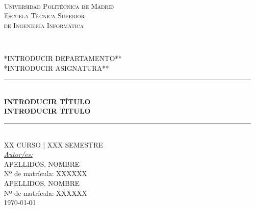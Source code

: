 \documentclass[12pt,a4paper, spanish]{article}
\begin{document}
\begin{titlepage}
  \newcommand{\HRule}{\rule{\linewidth}{0.5mm}}
  \centering

  \textsc{}\\[0.25cm]

  \textsc{\huge{Universidad Politécnica de Madrid}}\\[0.5cm]

  \textsc{\LARGE Escuela Técnica Superior\\ de Ingeniería Informática}\\[0.3cm]

  \begin{figure}[H] %
    \centering
    \qquad
    \\[0.5cm]
  \end{figure}

  \textsc{\Large **INTRODUCIR DEPARTAMENTO**}\\[0.25cm]
  \textsc{\large **INTRODUCIR ASIGNATURA**}\\[0.25cm]

  \HRule\\[0.4cm]

  {\huge\bfseries INTRODUCIR TÍTULO\\[0.4cm] INTRODUCIR TITULO}\\[0.4cm]

  \HRule\\[1.25cm]


  \textsc{\large XX CURSO | XXX SEMESTRE}\\[1.5cm]

  {\large\underline{\textit{Autor/es:}}}\\[0.2cm]
     \textsc{APELLIDOS, NOMBRE}\\
             Nº de matrícula: XXXXXX\\
     [0.5cm]
     \textsc{APELLIDOS, NOMBRE}\\
             Nº de matrícula: XXXXXX\\[0.5cm]

   \vfill\vfill\vfill
   {\large\today}

\end{titlepage}
\end{document}
